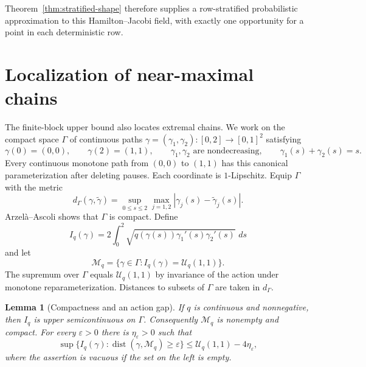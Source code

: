 \documentclass[11pt]{article}
\newtheorem{lemma}[theorem]{Lemma}
\theoremstyle{remark}
\newcommand{\dd}{\,d}
\newcommand{\eps}{\varepsilon}
\newcommand{\calU}{\mathcal U}
\newcommand{\dist}{\operatorname{dist}}
\begin{document}
Theorem~\ref{thm:stratified-shape} therefore supplies a row-stratified
probabilistic approximation to this Hamilton--Jacobi field, with exactly
one opportunity for a point in each deterministic row.


\section{Localization of near-maximal chains}
\label{sec:localization}

The finite-block upper bound also locates extremal chains.  We work on the
compact space $\Gamma$ of continuous paths
$\gamma=(\gamma_1,\gamma_2):[0,2]\to[0,1]^2$ satisfying
\[
 \gamma(0)=(0,0),\qquad \gamma(2)=(1,1),\qquad
 \gamma_1,\gamma_2\text{ are nondecreasing},\qquad
 \gamma_1(s)+\gamma_2(s)=s.
\]
Every continuous monotone path from $(0,0)$ to $(1,1)$ has this canonical
parameterization after deleting pauses.  Each coordinate is $1$-Lipschitz.
Equip $\Gamma$ with the metric
\[
 d_\Gamma(\gamma,\widetilde\gamma)
 =\sup_{0\le s\le2}\max_{j=1,2}
       |\gamma_j(s)-\widetilde\gamma_j(s)|.
\]
Arzel\`a--Ascoli shows that $\Gamma$ is compact.  Define
\begin{equation}\label{eq:path-action}
 I_q(\gamma)=2\int_0^2
 \sqrt{q(\gamma(s))\gamma_1'(s)\gamma_2'(s)}\,\dd s
\end{equation}
and let
\[
 \mathscr M_q
 =\{\gamma\in\Gamma:I_q(\gamma)=\calU_q(1,1)\}.
\]
The supremum over $\Gamma$ equals $\calU_q(1,1)$ by invariance of the action
under monotone reparameterization.  Distances to subsets of $\Gamma$ are
taken in $d_\Gamma$.

\begin{lemma}[Compactness and an action gap]\label{lem:action-gap}
If $q$ is continuous and nonnegative, then $I_q$ is upper semicontinuous on
$\Gamma$.  Consequently $\mathscr M_q$ is nonempty and compact.  For every
$\eps>0$ there is $\eta_\eps>0$ such that
\begin{equation}\label{eq:action-gap}
 \sup\{I_q(\gamma):\dist(\gamma,\mathscr M_q)\ge\eps\}
 \le\calU_q(1,1)-4\eta_\eps,
\end{equation}
where the assertion is vacuous if the set on the left is empty.
\end{lemma}
\end{document}
